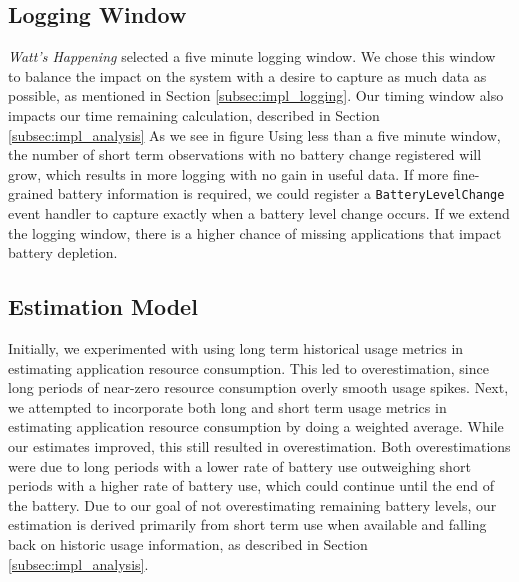 \subsection{Logging Window}
\emph{Watt's Happening} selected a five minute logging window.
We chose this window to balance the impact on the system with a desire to capture as much data as possible, as mentioned in Section \ref{subsec:impl_logging}.
Our timing window also impacts our time remaining calculation, described in Section \ref{subsec:impl_analysis} 
As we see in figure %
Using less than a five minute window, the number of short term observations with no battery change registered will grow, which results in more logging with no gain in useful data.
If more fine-grained battery information is required, we could register a \texttt{BatteryLevelChange} event handler to capture exactly when a battery level change occurs.
If we extend the logging window, there is a higher chance of missing applications that impact battery depletion.

\subsection{Estimation Model}
Initially, we experimented with using long term historical usage metrics in estimating application resource consumption.
This led to overestimation, since long periods of near-zero resource consumption overly smooth usage spikes.
Next, we attempted to incorporate both long and short term usage metrics in estimating application resource consumption by doing a weighted average.
While our estimates improved, this still resulted in overestimation. 
Both overestimations were due to long periods with a lower rate of battery use outweighing short periods with a higher rate of battery use, which could continue until the end of the battery.
Due to our goal of not overestimating remaining battery levels, our estimation is derived primarily from short term use when available and falling back on historic usage information, as described in Section \ref{subsec:impl_analysis}.

